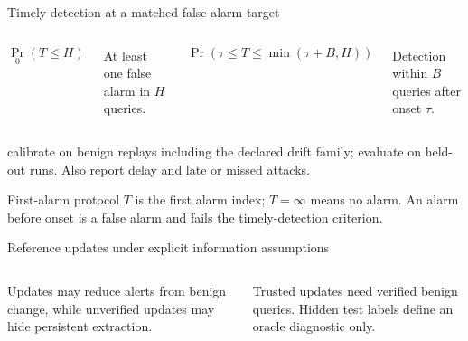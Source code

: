 \begin{frame}[t]{Timely detection at a matched false-alarm target}
\vspace{0.2cm}
\begin{columns}[T,onlytextwidth]
\[
\Pr_0(T\le H)
\]
{\small At least one false alarm in $H$ queries.\par}
\[
\Pr\!\left(\tau\le T\le \min(\tau+B,H)\right)
\]
{\small Detection within $B$ queries after onset $\tau$.\par}
\end{columns}
\par\vspace{0.35cm}
{\small{} calibrate on benign replays including the declared drift family; evaluate on held-out runs. Also report delay and late or missed attacks.\par}
\vspace{0.2cm}
\begin{block}{First-alarm protocol}
{\small $T$ is the first alarm index; $T=\infty$ means no alarm.
An alarm before onset is a false alarm and fails the timely-detection criterion.}
\end{block}
\end{frame}

\begin{frame}[t]{Reference updates under explicit information assumptions}
\vspace{0.3cm}
\begin{columns}[c,onlytextwidth]

\par
{\small Updates may reduce alerts from benign change, while unverified updates may hide persistent extraction.\par}
\vspace{0.3cm}
\par
{\small Trusted updates need verified benign queries. Hidden test labels define an oracle diagnostic only.\par}
\end{columns}
\end{frame}

